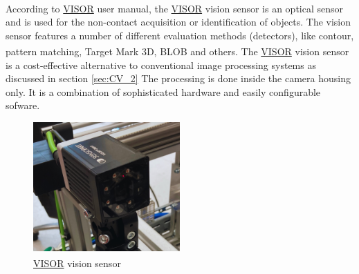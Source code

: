 According to \hyperref[acro:VISOR]{VISOR}\textsuperscript{\textregistered} \cite[page 22]{visor_user_manual} user manual, the \hyperref[acro:VISOR]{VISOR}\textsuperscript{\textregistered} vision sensor is an optical sensor and is used for the non-contact acquisition or identification of objects.
The vision sensor features a number of different evaluation methods (detectors), like contour, pattern matching, Target Mark 3D, BLOB and others.
The \hyperref[acro:VISOR]{VISOR}\textsuperscript{\textregistered} vision sensor is a cost-effective alternative to conventional image processing systems as discussed in
section \ref{sec:CV_2} The processing is done inside the camera housing only. It is a combination of sophisticated hardware and easily configurable sofware. \cite{sensopart-visor}
\begin{figure}[h]
    \centering
    \includegraphics[width=0.5\textwidth]{figures/vision-sensor.png}
    \caption{\hyperref[acro:VISOR]{VISOR}\textsuperscript{\textregistered} vision sensor}
    \label{fig:vision-sensor}
\end{figure}

